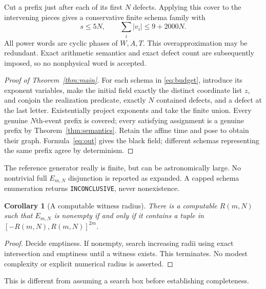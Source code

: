 \documentclass[11pt]{article}
\newtheorem{corollary}[theorem]{Corollary}
\theoremstyle{remark}\newtheorem{remark}[theorem]{Remark}
\begin{document}
Cut a prefix just after each of its first $N$ defects. Applying this cover to
the intervening pieces gives a conservative finite schema family with
\begin{equation}\label{eq:budget}
 s\le5N,\qquad\sum_i|v_i|\le9+2000N.
\end{equation}
All power words are cyclic phases of $W,A,T$. This overapproximation may be
redundant. Exact arithmetic semantics and exact defect count are subsequently
imposed, so no nonphysical word is accepted.

\begin{proof}[Proof of Theorem~\ref{thm:main}]
For each schema in \eqref{eq:budget}, introduce its exponent variables, make
the initial field exactly the distinct coordinate list $z$, and conjoin the
realization predicate, exactly $N$ contained defects, and a defect at the last
letter. Existentially project exponents and take the finite union.
Every genuine $N$th-event prefix is covered; every satisfying assignment is a
genuine prefix by Theorem~\ref{thm:semantics}. Retain the affine time and pose
to obtain their graph. Formula~\eqref{eq:out} gives the black field; different
schemas representing the same prefix agree by determinism.
\end{proof}

The reference generator really is finite, but can be astronomically large.
No nontrivial full $E_{m,N}$ disjunction is reported as expanded. A capped
schema enumeration returns \texttt{INCONCLUSIVE}, never nonexistence.

\begin{corollary}[A computable witness radius]
There is a computable $R(m,N)$ such that $E_{m,N}$ is nonempty if and only if it
contains a tuple in $[-R(m,N),R(m,N)]^{2m}$.
\end{corollary}
\begin{proof}
Decide emptiness. If nonempty, search increasing radii using exact intersection
and emptiness until a witness exists. This terminates. No modest complexity
or explicit numerical radius is asserted.
\end{proof}
This is different from assuming a search box before establishing completeness.
\end{document}

